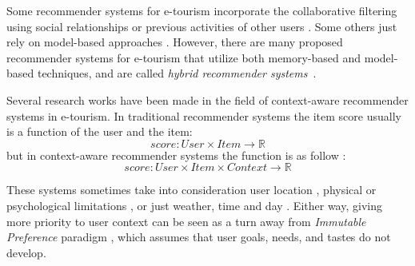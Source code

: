 
Some recommender systems for e-tourism incorporate the collaborative filtering using social relationships \cite{christensen2016social} \cite{kesorn2017personalized} or previous activities of other users \cite{rajaonarivo2019recommendation}. Some others just rely on model-based approaches \cite{sun2019building}. However, there are many proposed recommender systems for e-tourism that utilize both memory-based and model-based techniques, and are called \textit{hybrid recommender systems}~\cite{logesh2019exploring}\cite{logesh2019efficient}. 

Several research works have been made in the field of context-aware recommender systems in e-tourism. In traditional recommender systems the item score usually is a function of the user and the item:
\begin{equation}
    score: User \times Item \rightarrow \mathbb{R}
\end{equation}
but in context-aware recommender systems the function is as follow \cite{artemenko2017tourism}:
\begin{equation}
    score: User  \times Item \times Context \rightarrow \mathbb{R}
\end{equation}

These systems sometimes take into consideration user location \cite{logesh2018personalised},  physical or psychological limitations \cite{santos2019using}, or just weather, time and day \cite{bahramian_abbaspour_claramunt_2017}. Either way, giving more priority to user context can be seen as a turn away from \textit{Immutable Preference} paradigm \cite{pagano2016contextual}, which assumes that user goals, needs, and tastes do not develop.

